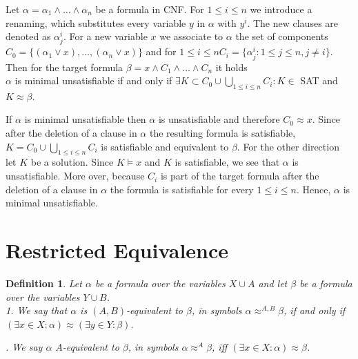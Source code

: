 \documentclass[12pt]{article}
\newtheorem{definition}{Definition}[section]
\begin{document}
Let $\alpha= \alpha_1 \wedge \ldots \wedge \alpha_n$ be a formula in CNF.  For $1 \leq i \leq n$ we introduce a renaming, which substitutes every variable $y$ in $\alpha$ with $y^i$. The new clauses are denoted as $\alpha^i_j$. For a new variable $x$
we associate to $\alpha$ the set of components
$C_0 =\{(\alpha_1 \vee x), \ldots, (\alpha_n \vee x)\}$ and for $1 \leq i \leq n C_i=\{\alpha^i_j : 1 \leq j \leq n, j\not = i\}$. Then for the target formula $\beta = x \wedge C_1 \wedge \ldots \wedge C_n$ it holds\\
$\alpha$ is minimal unsatisfiable if and only if $\exists K \subset C_0 \cup \bigcup_{1 \leq i \leq n} C_i:
K \in$ SAT and $K \approx \beta$.

If $\alpha$ is minimal unsatisfiable then $\alpha $ is unsatisfiable and therefore $C_0 \approx x$. Since
after the deletion of a clause in $\alpha$ the resulting formula is satisfiable, $K = C_0 \cup \bigcup_{1 \leq i \leq n} C_i$ is satisfiable and equivalent to $\beta$. For the other direction let $K$ be a solution. Since $K \models x$
and $K$ is satisfiable, we see that $\alpha$ is  unsatisfiable. More over, because $C_i$ is part of the target
formula after the deletion of a clause in $\alpha$ the formula is satisfiable for every $1 \leq i \leq n$. Hence,
$\alpha$ is minimal unsatisfiable.



\section{Restricted Equivalence}

\begin{definition}
Let $\alpha$ be a formula over the variables $X \cup A$ and let $\beta$ be a formula over the variables $Y \cup B$.\\
1. We say that $\alpha$ is {\em $(A,B)$-equivalent} to $\beta$,
in symbols $\alpha \approx^{A,B} \beta$, if and only if
$(\exists x \in X: \alpha) \approx (\exists y \in Y: \beta)$.

. We say
$\alpha$ {\em $A$-equivalent} to $\beta$,
in symbols $\alpha \approx^{A} \beta$, iff
$(\exists x \in X: \alpha) \approx \beta$.\\
\end{definition}
\end{document}
